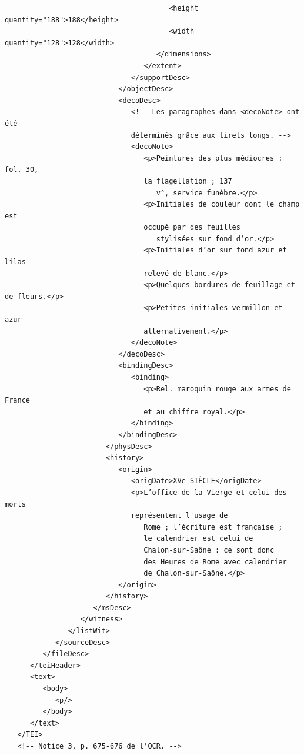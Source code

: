 \documentclass[a4paper,12pt,twoside]{book}
\begin{document}
\begin{verbatim}
                                       <height quantity="188">188</height>
                                       <width quantity="128">128</width>
                                    </dimensions>
                                 </extent>
                              </supportDesc>
                           </objectDesc>
                           <decoDesc>
                              <!-- Les paragraphes dans <decoNote> ont été 
                              déterminés grâce aux tirets longs. -->
                              <decoNote>
                                 <p>Peintures des plus médiocres : fol. 30, 
                                 la flagellation ; 137
                                    v°, service funèbre.</p>
                                 <p>Initiales de couleur dont le champ est 
                                 occupé par des feuilles
                                    stylisées sur fond d’or.</p>
                                 <p>Initiales d’or sur fond azur et lilas 
                                 relevé de blanc.</p>
                                 <p>Quelques bordures de feuillage et de fleurs.</p>
                                 <p>Petites initiales vermillon et azur 
                                 alternativement.</p>
                              </decoNote>
                           </decoDesc>
                           <bindingDesc>
                              <binding>
                                 <p>Rel. maroquin rouge aux armes de France 
                                 et au chiffre royal.</p>
                              </binding>
                           </bindingDesc>
                        </physDesc>
                        <history>
                           <origin>
                              <origDate>XVe SIÈCLE</origDate>
                              <p>L’office de la Vierge et celui des morts 
                              représentent l'usage de
                                 Rome ; l’écriture est française ; 
                                 le calendrier est celui de
                                 Chalon-sur-Saône : ce sont donc 
                                 des Heures de Rome avec calendrier
                                 de Chalon-sur-Saône.</p>
                           </origin>
                        </history>
                     </msDesc>
                  </witness>
               </listWit>
            </sourceDesc>
         </fileDesc>
      </teiHeader>
      <text>
         <body>
            <p/>
         </body>
      </text>
   </TEI>
   <!-- Notice 3, p. 675-676 de l'OCR. -->

\end{verbatim}
\end{document}
